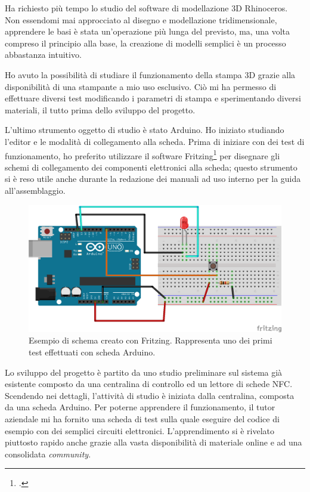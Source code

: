 \medskip

Ha richiesto più tempo lo studio del software di modellazione 3D Rhinoceros. Non essendomi mai approcciato al disegno e modellazione tridimensionale, apprendere le basi è stata un'operazione più lunga del previsto, ma, una volta compreso il principio alla base, la creazione di modelli semplici è un processo abbastanza intuitivo.

Ho avuto la possibilità di studiare il funzionamento della stampa 3D grazie alla disponibilità di una stampante a mio uso esclusivo. Ciò mi ha permesso di effettuare diversi test modificando i parametri di stampa e sperimentando diversi materiali, il tutto prima dello sviluppo del progetto.

\medskip

L'ultimo strumento oggetto di studio è stato Arduino. Ho iniziato studiando l'editor e le modalità di collegamento alla scheda. Prima di iniziare con dei test di funzionamento, ho preferito utilizzare il software Fritzing\footcite{http://fritzing.org/} per disegnare gli schemi di collegamento dei componenti elettronici alla scheda; questo strumento si è reso utile anche durante la redazione dei manuali ad uso interno per la guida all'assemblaggio.

\begin{figure}[H]
	\begin{center}
	\includegraphics[scale=0.62]{immagini/schema_arduino.png}
	\caption{Esempio di schema creato con Fritzing. Rappresenta uno dei primi test effettuati con scheda Arduino.}
	\end{center}
\end{figure}

Lo sviluppo del progetto è partito da uno studio preliminare sul sistema già esistente composto da una centralina di controllo ed un lettore di schede NFC.
Scendendo nei dettagli, l'attività di studio è iniziata dalla centralina, composta da una scheda Arduino. Per poterne apprendere il funzionamento, il tutor aziendale mi ha fornito una scheda di test sulla quale eseguire del codice di esempio con dei semplici circuiti elettronici. L'apprendimento si è rivelato piuttosto rapido anche grazie alla vasta disponibilità di materiale online e ad una consolidata \textit{community}.


